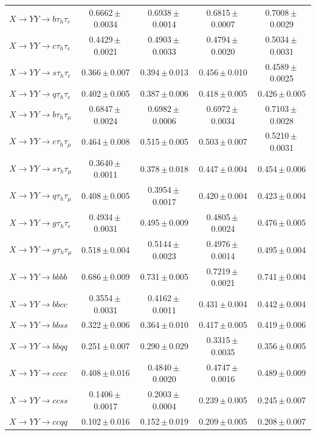 \documentclass[12pt]{article}   %
\begin{document}
\begin{landscape}
{\begin{longtable}{@{\extracolsep{\fill}}lcccc@{}}
\midrule
$X\to YY\to b\tau_h\tau_e$ & 0.6662\,$\pm$\,0.0034 & 0.6938\,$\pm$\,0.0014 & 0.6815\,$\pm$\,0.0007 & 0.7008\,$\pm$\,0.0029 \\
$X\to YY\to c\tau_h\tau_e$ & 0.4429\,$\pm$\,0.0021 & 0.4903\,$\pm$\,0.0033 & 0.4794\,$\pm$\,0.0020 & 0.5034\,$\pm$\,0.0031 \\
$X\to YY\to s\tau_h\tau_e$ & 0.366\,$\pm$\,0.007 & 0.394\,$\pm$\,0.013 & 0.456\,$\pm$\,0.010 & 0.4589\,$\pm$\,0.0025 \\
$X\to YY\to q\tau_h\tau_e$ & 0.402\,$\pm$\,0.005 & 0.387\,$\pm$\,0.006 & 0.418\,$\pm$\,0.005 & 0.426\,$\pm$\,0.005 \\
$X\to YY\to b\tau_h\tau_\mu$ & 0.6847\,$\pm$\,0.0024 & 0.6982\,$\pm$\,0.0006 & 0.6972\,$\pm$\,0.0034 & 0.7103\,$\pm$\,0.0028 \\
$X\to YY\to c\tau_h\tau_\mu$ & 0.464\,$\pm$\,0.008 & 0.515\,$\pm$\,0.005 & 0.503\,$\pm$\,0.007 & 0.5210\,$\pm$\,0.0031 \\
$X\to YY\to s\tau_h\tau_\mu$ & 0.3640\,$\pm$\,0.0011 & 0.378\,$\pm$\,0.018 & 0.447\,$\pm$\,0.004 & 0.454\,$\pm$\,0.006 \\
$X\to YY\to q\tau_h\tau_\mu$ & 0.408\,$\pm$\,0.005 & 0.3954\,$\pm$\,0.0017 & 0.420\,$\pm$\,0.004 & 0.423\,$\pm$\,0.004 \\
$X\to YY\to g\tau_h\tau_e$ & 0.4934\,$\pm$\,0.0031 & 0.495\,$\pm$\,0.009 & 0.4805\,$\pm$\,0.0024 & 0.476\,$\pm$\,0.005 \\
$X\to YY\to g\tau_h\tau_\mu$ & 0.518\,$\pm$\,0.004 & 0.5144\,$\pm$\,0.0023 & 0.4976\,$\pm$\,0.0014 & 0.495\,$\pm$\,0.004 \\
\midrule
$X\to YY\to bbbb$ & 0.686\,$\pm$\,0.009 & 0.731\,$\pm$\,0.005 & 0.7219\,$\pm$\,0.0021 & 0.741\,$\pm$\,0.004 \\
$X\to YY\to bbcc$ & 0.3554\,$\pm$\,0.0031 & 0.4162\,$\pm$\,0.0011 & 0.431\,$\pm$\,0.004 & 0.442\,$\pm$\,0.004 \\
$X\to YY\to bbss$ & 0.322\,$\pm$\,0.006 & 0.364\,$\pm$\,0.010 & 0.417\,$\pm$\,0.005 & 0.419\,$\pm$\,0.006 \\
$X\to YY\to bbqq$ & 0.251\,$\pm$\,0.007 & 0.290\,$\pm$\,0.029 & 0.3315\,$\pm$\,0.0035 & 0.356\,$\pm$\,0.005 \\
$X\to YY\to cccc$ & 0.408\,$\pm$\,0.016 & 0.4840\,$\pm$\,0.0020 & 0.4747\,$\pm$\,0.0016 & 0.489\,$\pm$\,0.009 \\
$X\to YY\to ccss$ & 0.1406\,$\pm$\,0.0017 & 0.2003\,$\pm$\,0.0004 & 0.239\,$\pm$\,0.005 & 0.245\,$\pm$\,0.007 \\
$X\to YY\to ccqq$ & 0.102\,$\pm$\,0.016 & 0.152\,$\pm$\,0.019 & 0.209\,$\pm$\,0.005 & 0.208\,$\pm$\,0.007 \\

\end{longtable}}
\end{landscape}
\end{document}
